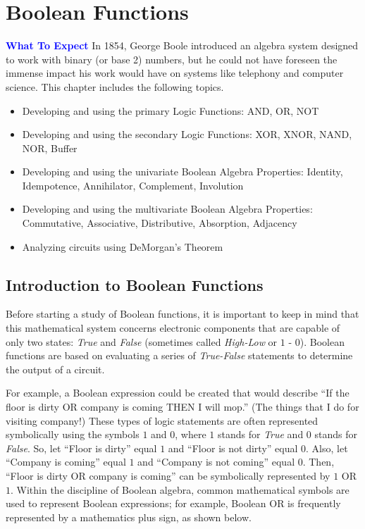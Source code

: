 \chapter{Boolean Functions}\label{ch04}

\begin{tcolorbox}[colback=blue!5!white,colframe=blue!75!black]
	\textcolor{blue}{\textbf{What To Expect}}
	\tcblower
	In 1854, George Boole introduced an algebra system designed to work with binary (or base 2) numbers, but he could not have foreseen the immense impact his work would have on systems like telephony and computer science. This chapter includes the following topics.

	\begin{itemize}
		\item Developing and using the primary Logic Functions: AND, OR, NOT
		\item Developing and using the secondary Logic Functions: XOR, XNOR, NAND, NOR, Buffer
		\item Developing and using the univariate Boolean Algebra Properties: Identity, Idempotence, Annihilator, Complement, Involution
		\item Developing and using the multivariate Boolean Algebra Properties: Commutative, Associative, Distributive, Absorption, Adjacency
		\item Analyzing circuits using DeMorgan's Theorem
	\end{itemize}
\end{tcolorbox}


\section{Introduction to Boolean Functions}

Before starting a study of Boolean functions, it is important to keep in mind that this mathematical system concerns electronic components that are capable of only two states: \emph{True} and \emph{False} (sometimes called \emph{High-Low} or $ 1 $ - $ 0 $). Boolean functions are based on evaluating a series of \emph{\emph{True}-\emph{False}} statements to determine the output of a circuit.

For example, a Boolean expression could be created that would describe ``If the floor is dirty OR company is coming THEN I will mop.'' (The things that I do for visiting company!) These types of logic statements are often represented symbolically using the symbols $ 1 $ and $ 0 $, where $ 1 $ stands for \emph{True} and $ 0 $ stands for \emph{False}. So, let ``Floor is dirty'' equal $ 1 $ and ``Floor is not dirty'' equal $ 0 $. Also, let ``Company is coming'' equal $ 1 $ and ``Company is not coming'' equal $ 0 $. Then, ``Floor is dirty OR company is coming'' can be symbolically represented by $ 1 $ \textsf{OR} $ 1 $. Within the discipline of Boolean algebra, common mathematical symbols are used to represent Boolean expressions; for example, Boolean \textsf{OR} is frequently represented by a mathematics plus sign, as shown below. 

